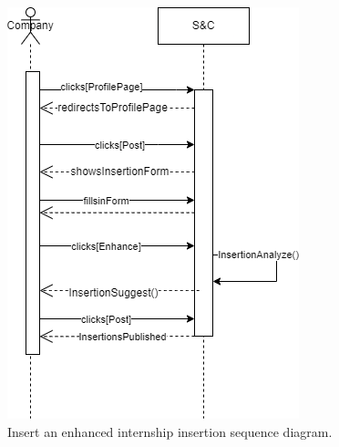 \begin{figure}[H]
    \begin{center}
        \includegraphics[width=1\linewidth]{Images/image2.png}
        \caption{Insert an enhanced internship insertion sequence diagram.}
        \label{fig:insert_an_enanched_internship_insertion_seqdiag}%
    \end{center}
\end{figure}


